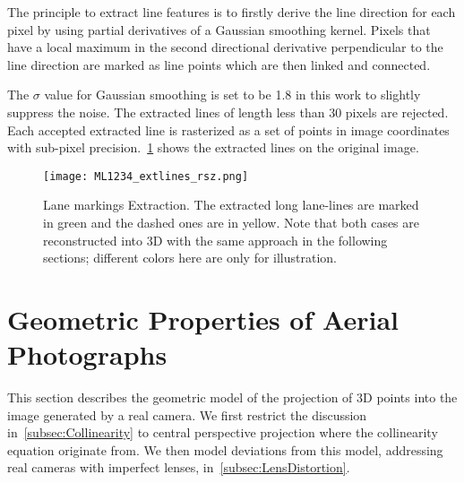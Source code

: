 The principle to extract line features is to firstly derive the line direction for each pixel by using partial derivatives of a Gaussian smoothing kernel. Pixels that have a local maximum in the second directional derivative perpendicular to the line direction are marked as line points which are then linked and connected.

The $\sigma$ value for Gaussian smoothing is set to be 1.8 in this work to slightly suppress the noise. The extracted lines of length less than 30 pixels are rejected. Each accepted extracted line is rasterized as a set of points in image coordinates with sub-pixel precision.~\cref{fig:LineExtraction} shows the extracted lines on the original image.
\begin{figure}
  \centering
  \texttt{[image: ML1234\_extlines\_rsz.png]}
  \caption{Lane markings Extraction. The extracted long lane-lines are marked in green and the dashed ones are in yellow.  Note that both cases are reconstructed into 3D with the same approach in the following sections; different colors here are only for illustration.}
  \label{fig:LineExtraction}
\end{figure}

\section{Geometric Properties of Aerial Photographs}
\label{sec:Geometry}

This section describes the geometric model of the projection of 3D points into the image generated by a real camera. We first restrict the discussion in~\cref{subsec:Collinearity} to central perspective projection where the collinearity equation originate from. We then model deviations from this model, addressing real cameras with imperfect lenses, in~\cref{subsec:LensDistortion}.

